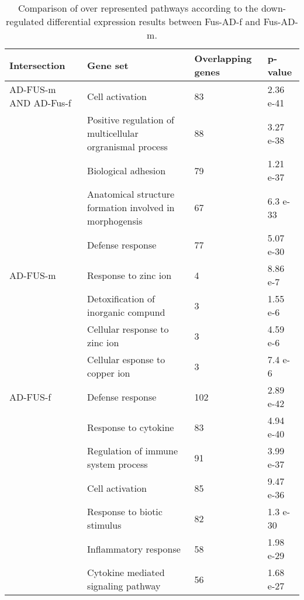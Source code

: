 \begin{table}[!ht]
\centering
\caption{Comparison of over represented pathways according to the down-regulated differential expression results between Fus-AD-f and Fus-AD-m.}
\begin{tabularx}{11cm}{L{2cm}L{2.5cm}L{3cm}C{1.5cm}}
\toprule
\textbf{Intersection} & \textbf{Gene set} & \textbf{Overlapping genes} & \textbf{p-value} \\
\midrule
AD-FUS-m AND AD-Fus-f & Cell activation                                            & 83  & 2.36 e-41 \\
                & Positive regulation of multicellular orgranismal process & 88  & 3.27 e-38 \\
                & Biological   adhesion                                      & 79  & 1.21 e-37 \\
                & Anatomical structure formation involved in morphogensis  & 67  & 6.3 e-33  \\
                & Defense response                                         & 77  & 5.07 e-30 \\
AD-FUS-m        & Response to zinc ion                                     & 4   & 8.86 e-7  \\
                & Detoxification of inorganic compund                      & 3   & 1.55 e-6  \\
                & Cellular response to zinc ion                            & 3   & 4.59 e-6  \\
                & Cellular esponse to copper ion                          & 3   & 7.4 e-6   \\
AD-FUS-f        & Defense response                                           & 102 & 2.89 e-42 \\
                & Response to cytokine                                     & 83  & 4.94 e-40 \\
                & Regulation of immune system process                      & 91  & 3.99 e-37 \\
                & Cell   activation                                          & 85  & 9.47 e-36 \\
                & Response to biotic stimulus                              & 82  & 1.3 e-30  \\
                & Inflammatory response                                    & 58  & 1.98 e-29 \\
                & Cytokine mediated signaling pathway                      & 56  & 1.68 e-27 \\
\bottomrule

\end{tabularx}
\end{table}



